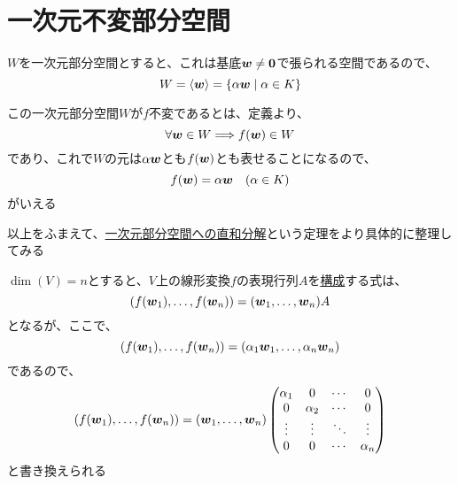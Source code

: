 \documentclass[../../../topic_linear-algebra]{subfiles}
\begin{document}
\sectionline
\section{一次元不変部分空間}\label{sec:1d-invariant-subspaces}

$W$を一次元部分空間とすると、これは基底$\vb*{w} \neq \vb*{0}$で張られる空間であるので、
\begin{equation*}
  W = \langle \vb*{w} \rangle = \{ \alpha \vb*{w} \mid \alpha \in K \}
\end{equation*}

この一次元部分空間$W$が$f$不変であるとは、定義より、
\begin{equation*}
  \forall \vb*{w} \in W \Longrightarrow f(\vb*{w}) \in W
\end{equation*}
であり、これで$W$の元は$\alpha \vb*{w}$とも$f(\vb*{w})$とも表せることになるので、
\begin{equation*}
  f(\vb*{w}) = \alpha \vb*{w} \quad (\alpha \in K)
\end{equation*}
がいえる

\br

以上をふまえて、\hyperref[thm:diagonalizable-by-1d-invariant-sum]{一次元部分空間への直和分解}という定理をより具体的に整理してみる

\br

$\dim(V) = n$とすると、$V$上の線形変換$f$の表現行列$A$を\hyperref[sec:construction-of-matrix-rep]{構成}する式は、
\begin{equation*}
  (f(\vb*{w}_1), \ldots, f(\vb*{w}_n)) = (\vb*{w}_1, \ldots, \vb*{w}_n) A
\end{equation*}
となるが、ここで、
\begin{equation*}
  (f(\vb*{w}_1), \ldots, f(\vb*{w}_n)) = (\alpha_1 \vb*{w}_1, \ldots, \alpha_n \vb*{w}_n)
\end{equation*}
であるので、
\begin{equation*}
  (f(\vb*{w}_1), \ldots, f(\vb*{w}_n)) = (\vb*{w}_1, \ldots, \vb*{w}_n) \begin{pmatrix}
    \alpha_1 & 0        & \cdots & 0        \\
    0        & \alpha_2 & \cdots & 0        \\
    \vdots   & \vdots   & \ddots & \vdots   \\
    0        & 0        & \cdots & \alpha_n
  \end{pmatrix}
\end{equation*}
と書き換えられる
\end{document}
